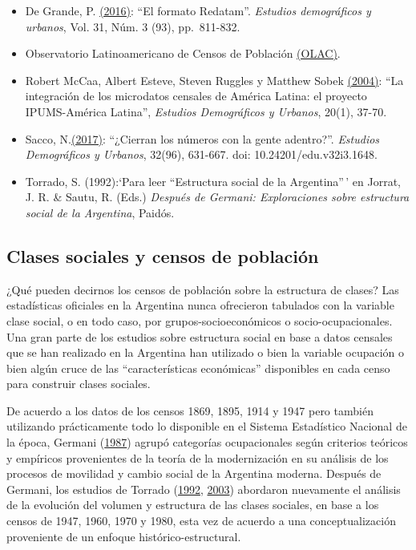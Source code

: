 \documentclass[
]{article}
\begin{document}
\begin{itemize}
\item
  De Grande, P. \href{https://estudiosdemograficosyurbanos.colmex.mx/index.php/edu/article/view/15/pdf}{(2016)}: ``El formato Redatam''. \emph{Estudios demográficos y urbanos}, Vol. 31, Núm. 3 (93), pp.~811-832.
\item
  Observatorio Latinoamericano de Censos de Población \href{https://observatoriocensal.org/}{(OLAC)}.
\item
  Robert McCaa, Albert Esteve, Steven Ruggles y Matthew Sobek \href{https://estudiosdemograficosyurbanos.colmex.mx/index.php/edu/article/view/1229/2203}{(2004)}: ``La integración de los microdatos censales de América Latina: el proyecto IPUMS-América Latina'', \emph{Estudios Demográficos y Urbanos}, 20(1), 37-70.
\item
  Sacco, N.\href{https://estudiosdemograficosyurbanos.colmex.mx/index.php/edu/article/view/1648}{(2017)}: ``¿Cierran los números con la gente adentro?''. \emph{Estudios Demográficos y Urbanos}, 32(96), 631-667. doi: 10.24201/edu.v32i3.1648.
\item
  Torrado, S. (1992):`Para leer ``Estructura social de la Argentina''\,' en Jorrat, J. R. \& Sautu, R. (Eds.) \emph{Después de Germani: Exploraciones sobre estructura social de la Argentina}, Paidós.
\end{itemize}

\hypertarget{clases3}{%
\subsection{Clases sociales y censos de población}\label{clases3}}

¿Qué pueden decirnos los censos de población sobre la estructura de clases? Las estadísticas oficiales en la Argentina nunca ofrecieron tabulados con la variable clase social, o en todo caso, por grupos-socioeconómicos o socio-ocupacionales. Una gran parte de los estudios sobre estructura social en base a datos censales que se han realizado en la Argentina han utilizado o bien la variable ocupación o bien algún cruce de las ``características económicas'' disponibles en cada censo para construir clases sociales.

De acuerdo a los datos de los censos 1869, 1895, 1914 y 1947 pero también utilizando prácticamente todo lo disponible en el Sistema Estadístico Nacional de la época, Germani (\protect\hyperlink{ref-Germani1987}{1987}) agrupó categorías ocupacionales según criterios teóricos y empíricos provenientes de la teoría de la modernización en su análisis de los procesos de movilidad y cambio social de la Argentina moderna. Después de Germani, los estudios de Torrado (\protect\hyperlink{ref-Torrado1992}{1992}, \protect\hyperlink{ref-Torrado2003a}{2003}) abordaron nuevamente el análisis de la evolución del volumen y estructura de las clases sociales, en base a los censos de 1947, 1960, 1970 y 1980, esta vez de acuerdo a una conceptualización proveniente de un enfoque histórico-estructural.
\end{document}
